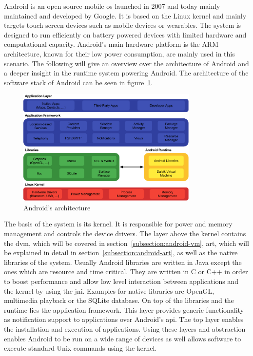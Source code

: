 Android is an open source mobile \gls{os} launched in 2007 and today mainly maintained and developed by Google.
It is based on the Linux kernel and mainly targets touch screen devices such as mobile devices or wearables.
The system is designed to run efficiently on battery powered devices with limited hardware and computational capacity.
Android's main hardware platform is the ARM architecture, known for their low power consumption, are mainly used in this scenario.
The following will give an overview over the architecture of Android and a deeper insight in the runtime system powering Android.
The architecture of the software stack of Android can be seen in figure~\ref{fig:androidArchitecture}.
\newline

\begin{figure}[h]
    \centering
    \includegraphics[width=0.8\textwidth]{data/stack.png}
    \caption{Android's architecture \cite{androidStack}}
    \label{fig:androidArchitecture}
\end{figure}

The basis of the system is its kernel.
It is responsible for power and memory management and controls the device drivers.
\newline
The layer above the kernel contains the \gls{dvm}, which will be covered in section~\ref{subsection:android-vm}, \gls{art}, which will be explained in detail in section~\ref{subsection:android-art}, as well as the native libraries of the system.
Usually Android libraries are written in Java except the ones which are resource and time critical.
They are written in C or C++ in order to boost performance and allow low level interaction between applications and the kernel by using the \gls{jni}.
Examples for native libraries are OpenGL, multimedia playback or the SQLite database.
\newline
On top of the libraries and the runtime lies the application framework.
This layer provides generic functionality as notification support to applications over Android's \gls{api}.
\newline
The top layer enables the installation and execution of applications.
\newline
Using these layers and abstraction enables Android to be run on a wide range of devices as well allows software to execute standard Unix commands using the kernel.
